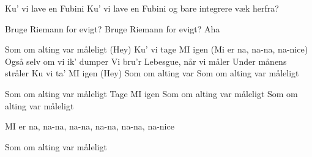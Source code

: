 \documentclass[a4paper,11pt]{article}
\begin{document}
\begin{song}
 Ku' vi lave en Fubini
Ku' vi lave en Fubini
og bare integrere væk herfra?

 Bruge Riemann for evigt?
Bruge Riemann for evigt?
Aha
 
 Som om alting var måleligt (Hey)
Ku' vi tage MI igen (Mi er na, na-na, na-nice)
Også selv om vi ik' dumper
Vi bru'r Lebesgue, når vi måler
Under månens stråler
Ku vi ta’ MI igen (Hey)
Som om alting var
Som om alting var måleligt

 Som om alting var måleligt
Tage MI igen 
Som om alting var måleligt
Som om alting var måleligt

 MI er na, na-na, na-na, na-na, na-na, na-nice

 Som om alting var måleligt

\end{song}
\end{document}
